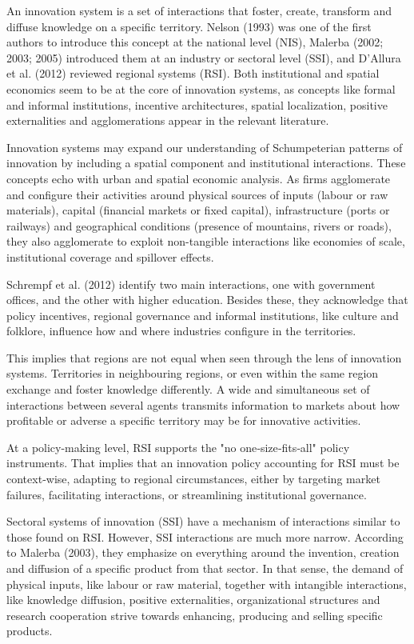 \documentclass[12pt,a4paper]{article}
\begin{document}
An innovation system is a set of interactions that foster, create, transform and diffuse knowledge on a specific territory. Nelson (1993) was one of the first authors to introduce this concept at the national level (NIS), Malerba (2002; 2003; 2005) introduced them at an industry or sectoral level (SSI), and D’Allura et al. (2012) reviewed regional systems (RSI). Both institutional and spatial economics seem to be at the core of innovation systems, as concepts like formal and informal institutions, incentive architectures, spatial localization, positive externalities and agglomerations appear in the relevant literature.

Innovation systems may expand our understanding of Schumpeterian patterns of innovation by including a spatial component and institutional interactions. These concepts echo with urban and spatial economic analysis. As firms agglomerate and configure their activities around physical sources of inputs (labour or raw materials), capital (financial markets or fixed capital), infrastructure (ports or railways) and geographical conditions (presence of mountains, rivers or roads), they also agglomerate to exploit non-tangible interactions like economies of scale, institutional coverage and spillover effects. 

Schrempf et al. (2012) identify two main interactions, one with government offices, and the other with higher education. Besides these, they acknowledge that policy incentives, regional governance and informal institutions, like culture and folklore, influence how and where industries configure in the territories.

This implies that regions are not equal when seen through the lens of innovation systems. Territories in neighbouring regions, or even within the same region exchange and foster knowledge differently. A wide and simultaneous set of interactions between several agents transmits information to markets about how profitable or adverse a specific territory may be for innovative activities.

At a policy-making level, RSI supports the "no one‐size‐fits‐all" policy instruments. That implies that an innovation policy accounting for RSI must be context‐wise, adapting to regional circumstances, either by targeting market failures, facilitating interactions, or streamlining institutional governance. 

Sectoral systems of innovation (SSI) have a mechanism of interactions similar to those found on RSI. However, SSI interactions are much more narrow. According to Malerba (2003), they emphasize on everything around the invention, creation and diffusion of a specific product from that sector. In that sense, the demand of physical inputs, like labour or raw material, together with intangible interactions, like knowledge diffusion, positive externalities, organizational structures and research cooperation strive towards enhancing, producing and selling specific products. 
\end{document}

